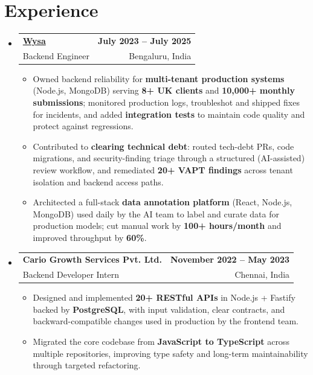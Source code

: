 \documentclass[letterpaper,10pt]{article}
\makeatletter
\newcommand{\resumeItem}[1]{
  \item\small{#1\vspace{-1pt}}
}
\newcommand{\resumeSubheading}[4]{
  \vspace{1pt}\item
    \begin{tabular*}{0.985\textwidth}[t]{l@{\extracolsep{\fill}}r}
      \textbf{#1} & \textbf{\small #2} \\
      {\small\color{ResumeSlate} #3} & {\small\color{ResumeSlate} #4} \\
    \end{tabular*}\vspace{-6pt}
}
\newcommand{\resumeSubHeadingListStart}{\begin{itemize}[leftmargin=0.0in, label={}, itemsep=2pt, topsep=2pt]}
\newcommand{\resumeSubHeadingListEnd}{\end{itemize}}
\newcommand{\resumeItemListStart}{\begin{itemize}[leftmargin=0.18in, itemsep=2pt, topsep=1pt]}
\newcommand{\resumeItemListEnd}{\end{itemize}\vspace{-4pt}}
\makeatother
\begin{document}
\section{Experience}
\resumeSubHeadingListStart
  \resumeSubheading
    {\href{https://www.wysa.io}{Wysa}}{July 2023 -- July 2025}
    {Backend Engineer}{Bengaluru, India}
    \resumeItemListStart
      \resumeItem{Owned backend reliability for \textbf{multi-tenant production systems} (Node.js, MongoDB) serving \textbf{8+ UK clients} and \textbf{10{,}000+ monthly submissions}; monitored production logs, troubleshot and shipped fixes for incidents, and added \textbf{integration tests} to maintain code quality and protect against regressions.}
      \resumeItem{Contributed to \textbf{clearing technical debt}: routed tech-debt PRs, code migrations, and security-finding triage through a structured (AI-assisted) review workflow, and remediated \textbf{20+ VAPT findings} across tenant isolation and backend access paths.}
      \resumeItem{Architected a full-stack \textbf{data annotation platform} (React, Node.js, MongoDB) used daily by the AI team to label and curate data for production models; cut manual work by \textbf{100+ hours/month} and improved throughput by \textbf{60\%}.}
    \resumeItemListEnd
  \resumeSubheading
    {Cario Growth Services Pvt. Ltd.}{November 2022 -- May 2023}
    {Backend Developer Intern}{Chennai, India}
    \resumeItemListStart
      \resumeItem{Designed and implemented \textbf{20+ RESTful APIs} in Node.js + Fastify backed by \textbf{PostgreSQL}, with input validation, clear contracts, and backward-compatible changes used in production by the frontend team.}
      \resumeItem{Migrated the core codebase from \textbf{JavaScript to TypeScript} across multiple repositories, improving type safety and long-term maintainability through targeted refactoring.}
    \resumeItemListEnd
\resumeSubHeadingListEnd
\vspace{-4pt}
\end{document}
